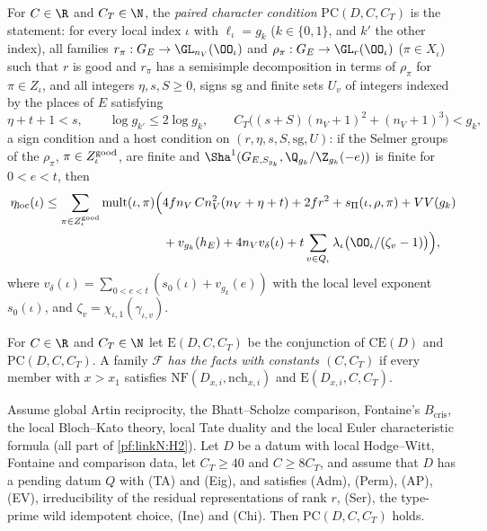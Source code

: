 \begin{definition}\label{pf:linkN:PCC}
For $C\in\R$ and $C_T\in\N$, the \emph{paired character condition} $\mathrm{PC}(D,C,C_T)$ is the statement: for every local index
$\iota$ with $\ell_\iota=g_k$ ($k\in\{0,1\}$, and $k'$ the other index), all families $r_\pi:G_E\to\GL_{n_V}(\OO_\iota)$ and
$\rho_\pi:G_E\to\GL_r(\OO_\iota)$ ($\pi\in X_\iota$) such that $r$ is good and $r_\pi$ has a semisimple decomposition in terms of $\rho_\pi$
for $\pi\in Z_\iota$, and all integers $\eta,s,S\ge0$, signs $\mathrm{sg}$ and finite sets $U_v$ of integers indexed by the places of
$E$ satisfying
\[
\eta+t+1<s,\qquad\log g_{k'}\le2\log g_k,\qquad C_T\bigl((s+S)(n_V+1)^2+(n_V+1)^3\bigr)<g_k,
\]
a sign condition and a host condition on $(r,\eta,s,S,\mathrm{sg},U)$: if the Selmer groups of the $\rho_\pi$, $\pi\in Z^{\mathrm{good}}_\iota$, are
finite and $\Sha^1(G_{E,S_{g_k}},\Q_{g_k}/\Z_{g_k}(-e))$ is finite for $0<e<t$, then
\[
\begin{aligned}
\linkNloc(\iota)\le\sum_{\pi\in\linkNgood_\iota}\linkNmult(\iota,\pi)\Bigl(&4fn_V\,Cn_V^2(n_V+\eta+t)+2fr^2+\linkNs(\iota,\rho,\pi)+VV(g_k)\\
&+v_{g_k}(h_E)+4n_Vv_\delta(\iota)+t\sum_{v\in Q_\iota}\lambda_\iota\bigl(\OO_\iota/(\zeta_v-1)\bigr)\Bigr),
\end{aligned}
\]
where $v_\delta(\iota)=\sum_{0<e<t}(s_0(\iota)+v_{g_k}(e))$ with the local level exponent $s_0(\iota)$, and $\zeta_v=\chi_{\iota,1}(\gamma_{\iota,v})$.
\end{definition}

\begin{definition}\label{pf:linkN:extraDef}
For $C\in\R$ and $C_T\in\N$ let $\mathrm{E}(D,C,C_T)$ be the conjunction of $\mathrm{CE}(D)$ and $\mathrm{PC}(D,C,C_T)$. A family
$\mathcal F$ \emph{has the facts with constants $(C,C_T)$} if every member with $x>x_1$ satisfies $\mathrm{NF}(D_{x,i},\mathrm{nch}_{x,i})$
and $\mathrm{E}(D_{x,i},C,C_T)$.
\end{definition}

\begin{proposition}\label{pf:linkN:closinglocal}
Assume global Artin reciprocity, the Bhatt--Scholze comparison, Fontaine's $B_{\mathrm{cris}}$, the local Bloch--Kato theory,
local Tate duality and the local Euler characteristic formula (all part of \cref{pf:linkN:H2}). Let $D$ be a datum with local
Hodge--Witt, Fontaine and comparison data, let $C_T\ge40$ and $C\ge8C_T$, and assume that $D$ has a pending datum $Q$ with (TA)
and (Eig), and satisfies (Adm), (Perm), (AP), (EV), irreducibility of the residual representations of rank $r$, (Ser), the type-prime
wild idempotent choice, (Ine) and (Chi). Then $\mathrm{PC}(D,C,C_T)$ holds.
\end{proposition}


